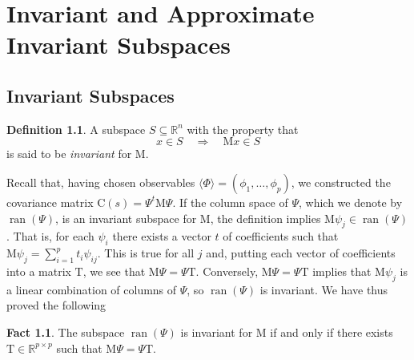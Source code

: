 \documentclass[12pt,letterpaper]{report}
\theoremstyle{plain}
\theoremstyle{definition}
\newtheorem{definition}[theorem]{Definition}
\newtheorem*{fact}{Fact}
\theoremstyle{remark}
\numberwithin{theorem}{chapter}
\numberwithin{claim}{chapter}
\numberwithin{equation}{chapter}
\numberwithin{conjecture}{chapter}
\newcommand\R{\ensuremath{\mathbb{R}}}
\newcommand\C{\ensuremath{\mathrm{C}}}
\newcommand\M{\ensuremath{\mathrm{M}}}
\newcommand\T{\ensuremath{\mathrm{T}}}
\newcommand\ran{\ensuremath{\operatorname{ran}}}
\newcommand\<{\ensuremath{\langle}}
\renewcommand\>{\ensuremath{\rangle}}
\begin{document}
\chapter{Invariant and Approximate Invariant Subspaces}
\label{cha:invar-appr-invar}
\section{Invariant Subspaces}

\begin{definition}
A subspace $S \subseteq \R^n$ with the property that
\[
x \in S \quad \Longrightarrow \quad \M x \in S
\]
is said to be \emph{invariant} for $\M$.
\end{definition}

Recall that, having chosen observables $\<\Phi\> = (\phi_1, \dots, \phi_p)$, we
constructed the covariance matrix 
$\C(s) = \Psi^t \M \Psi$. 
If the column space of $\Psi$, which we denote by $\ran(\Psi)$, is an invariant
subspace for $\M$, the definition implies $\M\psi_j \in \ran(\Psi)$.
That is, for each $\psi_i$ there exists a vector
$t$ of coefficients such that $\M \psi_j = \sum_{i=1}^p t_i \psi_{ij}$. 
This is true for all $j$ and, putting each vector of
coefficients into a matrix $\T$, we see that 
$\M \Psi = \Psi \T$. Conversely, $\M\Psi = \Psi \T$ implies that $\M\psi_j$ is a
linear combination of columns of $\Psi$, so $\ran(\Psi)$ is invariant. We have
thus proved the following 
\begin{fact}
\label{fact:3.1.1}
The subspace $\ran(\Psi)$ is invariant for $\M$ if and only if there exists 
$\T \in \R^{p\times p}$ such that $\M\Psi = \Psi \T$.
\end{fact}
\end{document}
